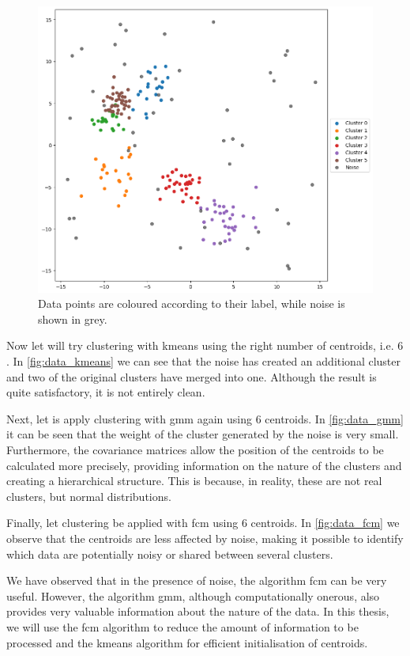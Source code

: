\begin{figure}[ht]
    \centering
    \includegraphics[width=0.9\linewidth]{Figures/dati_veri.png}
    \caption[example of data for clustering]{Data points are coloured according to their label, while noise is shown in grey.}
    \label{fig:data_true}
\end{figure}

\noindent Now let will try clustering with \gls{kmeans} using the right number of centroids, i.e. $6$. In \cref{fig:data_kmeans} we can see that the noise has created an additional cluster and two of the original clusters have merged into one. Although the result is quite satisfactory, it is not entirely clean.

\noindent Next, let is apply clustering with \gls{gmm} again using $6$ centroids. In \cref{fig:data_gmm} it can be seen that the weight of the cluster generated by the noise is very small. Furthermore, the covariance matrices allow the position of the centroids to be calculated more precisely, providing information on the nature of the clusters and creating a hierarchical structure. This is because, in reality, these are not real clusters, but normal distributions.

\noindent Finally, let clustering be applied with \gls{fcm} using $6$ centroids. In \cref{fig:data_fcm} we observe that the centroids are less affected by noise, making it possible to identify which data are potentially noisy or shared between several clusters.

\bigskip
We have observed that in the presence of noise, the algorithm \gls{fcm} can be very useful. However, the algorithm \gls{gmm}, although computationally onerous, also provides very valuable information about the nature of the data. In this thesis, we will use the \gls{fcm} algorithm to reduce the amount of information to be processed and the \gls{kmeans} algorithm for efficient initialisation of centroids.
